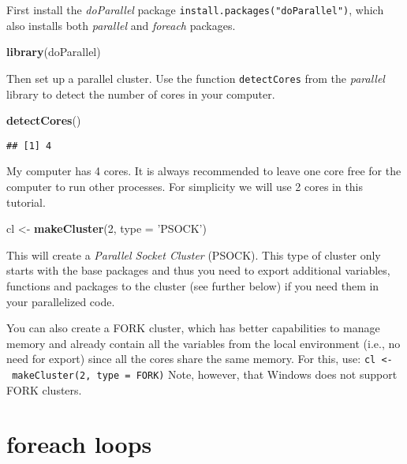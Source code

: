 \documentclass[]{article}
\newenvironment{Shaded}{\begin{snugshade}}{\end{snugshade}}
\newcommand{\KeywordTok}[1]{\textcolor[rgb]{0.13,0.29,0.53}{\textbf{#1}}}
\newcommand{\DataTypeTok}[1]{\textcolor[rgb]{0.13,0.29,0.53}{#1}}
\newcommand{\DecValTok}[1]{\textcolor[rgb]{0.00,0.00,0.81}{#1}}
\newcommand{\StringTok}[1]{\textcolor[rgb]{0.31,0.60,0.02}{#1}}
\newcommand{\NormalTok}[1]{#1}
\begin{document}
First install the \emph{doParallel} package
\texttt{install.packages("doParallel")}, which also installs both
\emph{parallel} and \emph{foreach} packages.

\begin{Shaded}
\begin{Highlighting}[]
\KeywordTok{library}\NormalTok{(doParallel)}
\end{Highlighting}
\end{Shaded}

Then set up a parallel cluster. Use the function \texttt{detectCores}
from the \emph{parallel} library to detect the number of cores in your
computer.

\begin{Shaded}
\begin{Highlighting}[]
\KeywordTok{detectCores}\NormalTok{()}
\end{Highlighting}
\end{Shaded}

\begin{verbatim}
## [1] 4
\end{verbatim}

My computer has 4 cores. It is always recommended to leave one core free
for the computer to run other processes. For simplicity we will use 2
cores in this tutorial.

\begin{Shaded}
\begin{Highlighting}[]
\NormalTok{cl <-}\StringTok{ }\KeywordTok{makeCluster}\NormalTok{(}\DecValTok{2}\NormalTok{, }\DataTypeTok{type =} \StringTok{'PSOCK'}\NormalTok{)}
\end{Highlighting}
\end{Shaded}

This will create a \emph{Parallel Socket Cluster} (PSOCK). This type of
cluster only starts with the base packages and thus you need to export
additional variables, functions and packages to the cluster (see further
below) if you need them in your parallelized code.

You can also create a FORK cluster, which has better capabilities to
manage memory and already contain all the variables from the local
environment (i.e., no need for export) since all the cores share the
same memory. For this, use:
\texttt{cl\ \textless{}-\ makeCluster(2,\ type\ =\ \textquotesingle{}FORK\textquotesingle{})}
Note, however, that Windows does not support FORK clusters.

\section{foreach loops}\label{foreach-loops}
\end{document}
